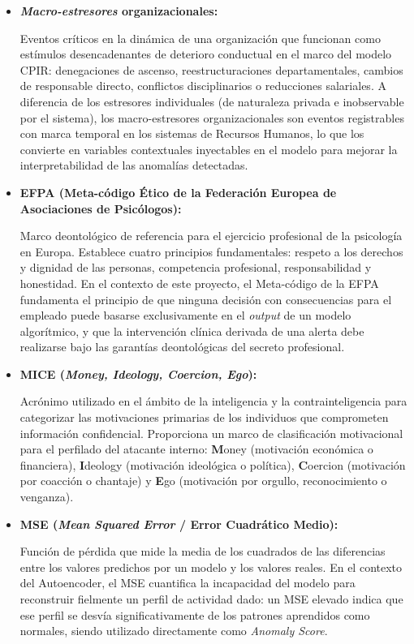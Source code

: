 \documentclass[IB]{TFUOC}%
\begin{document}
\begin{itemize}
    \item \textbf{\textit{Macro-estresores} organizacionales:}
    
    Eventos críticos en la dinámica de una organización que funcionan como estímulos desencadenantes de deterioro conductual en el marco del modelo CPIR: denegaciones de 
    ascenso, reestructuraciones departamentales, cambios de responsable directo, conflictos disciplinarios o reducciones salariales. A diferencia de los estresores individuales 
    (de naturaleza privada e inobservable por el sistema), los macro-estresores organizacionales son eventos registrables con marca temporal en los sistemas de Recursos Humanos, lo que los convierte en variables contextuales inyectables en el modelo para mejorar la interpretabilidad de las anomalías detectadas.

    \item \textbf{EFPA (Meta-código Ético de la Federación Europea 
    de Asociaciones de Psicólogos):}
    
    Marco deontológico de referencia para el ejercicio profesional de la psicología en Europa. Establece cuatro principios fundamentales: respeto a los derechos y dignidad de las personas, competencia profesional, responsabilidad y honestidad. En el contexto de este proyecto, el Meta-código de la EFPA fundamenta el principio de que ninguna decisión 
    con consecuencias para el empleado puede basarse exclusivamente en el \textit{output} de un modelo algorítmico, y que la intervención clínica derivada de una alerta debe 
    realizarse bajo las garantías deontológicas del secreto profesional.

    \item \textbf{MICE (\textit{Money, Ideology, Coercion, Ego}):}
    
    Acrónimo utilizado en el ámbito de la inteligencia y la contrainteligencia para categorizar las motivaciones primarias de los individuos que comprometen información confidencial. Proporciona un marco de clasificación motivacional para el perfilado del atacante interno: \textbf{M}oney (motivación económica o financiera), \textbf{I}deology (motivación ideológica o política), \textbf{C}oercion (motivación por coacción o chantaje) y \textbf{E}go (motivación por orgullo, reconocimiento o venganza).

    \item \textbf{MSE (\textit{Mean Squared Error} / Error Cuadrático Medio):}
    
    Función de pérdida que mide la media de los cuadrados de las diferencias entre los valores predichos por un modelo y los valores reales. En el contexto del Autoencoder, el MSE cuantifica la incapacidad del modelo para reconstruir fielmente un perfil de actividad dado: un MSE elevado indica que ese perfil se desvía significativamente de los patrones aprendidos como normales, siendo utilizado directamente como \textit{Anomaly Score}.


\end{itemize}
\end{document}
